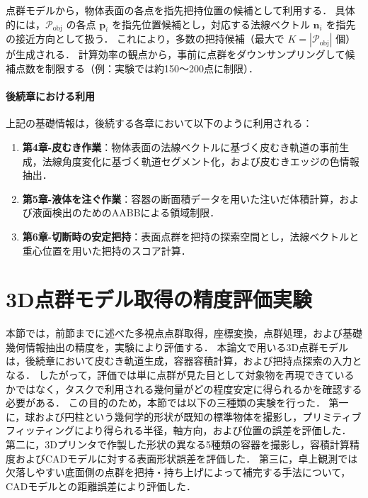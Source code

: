 点群モデルから，物体表面の各点を指先把持位置の候補として利用する．
具体的には，$\mathcal{P}_{\mathrm{obj}}$ の各点 $\bm{p}_i$ を指先位置候補とし，対応する法線ベクトル $\bm{n}_i$ を指先の接近方向として扱う．
これにより，多数の把持候補（最大で $K = |\mathcal{P}_{\mathrm{obj}}|$ 個）が生成される．
計算効率の観点から，事前に点群をダウンサンプリングして候補点数を制限する（例：実験では約150〜200点に制限）．

\paragraph{後続章における利用}

上記の基礎情報は，後続する各章において以下のように利用される：

\begin{enumerate}
  \item \textbf{第4章-皮むき作業}：物体表面の法線ベクトルに基づく皮むき軌道の事前生成，法線角度変化に基づく軌道セグメント化，および皮むきエッジの色情報抽出．
  \item \textbf{第5章-液体を注ぐ作業}：容器の断面積データを用いた注いだ体積計算，および液面検出のためのAABBによる領域制限．
  \item \textbf{第6章-切断時の安定把持}：表面点群を把持の探索空間とし，法線ベクトルと重心位置を用いた把持のスコア計算．
\end{enumerate}



\section{3D点群モデル取得の精度評価実験}
\label{sec:system:pointcloud:evaluation}

本節では，前節までに述べた多視点点群取得，座標変換，点群処理，および基礎幾何情報抽出の精度を，実験により評価する．
本論文で用いる3D点群モデルは，後続章において皮むき軌道生成，容器容積計算，および把持点探索の入力となる．
したがって，評価では単に点群が見た目として対象物を再現できているかではなく，タスクで利用される幾何量がどの程度安定に得られるかを確認する必要がある．
この目的のため，本節では以下の三種類の実験を行った．
第一に，球および円柱という幾何学的形状が既知の標準物体を撮影し，プリミティブフィッティングにより得られる半径，軸方向，および位置の誤差を評価した．
第二に，3Dプリンタで作製した形状の異なる5種類の容器を撮影し，容積計算精度およびCADモデルに対する表面形状誤差を評価した．
第三に，卓上観測では欠落しやすい底面側の点群を把持・持ち上げによって補完する手法について，CADモデルとの距離誤差により評価した．

